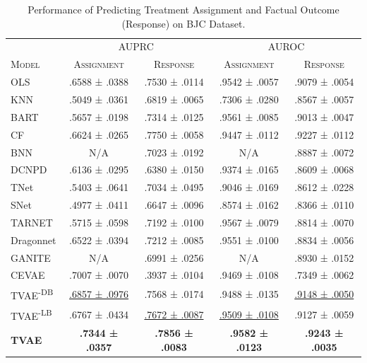 \begin{table}[t]
  \caption{Performance of Predicting Treatment Assignment and Factual Outcome (Response) on BJC Dataset.}
  \label{Table2}
  \centering
\fontsize{7.5pt}{9pt}\selectfont
  
  \begin{tabular}{lcccc}
    \toprule
    & \multicolumn{2}{c}{AUPRC}&\multicolumn{2}{c}{AUROC}\\
    \textsc{Model} & \textsc{Assignment} & \textsc{Response} &  \textsc{Assignment} & \textsc{Response}\\
    \midrule
    OLS & .6588 ± .0388  & .7530 ± .0114    & .9542 ± .0057  & .9079 ± .0054  \\
    KNN  & .5049 ± .0361  & .6819 ± .0065    & .7306 ± .0280  & .8567 ± .0057 \\
    BART & .5657 ± .0198  & .7314 ± .0125    & .9561 ± .0085  & .9013 ± .0047  \\
    CF  & .6624 ± .0265  & .7750 ± .0058    & .9447 ± .0112  & .9227 ± .0112  \\
    BNN  & N/A  & .7023 ± .0192    &  N/A & .8887 ± .0072 \\
    DCNPD   & .6136 ± .0295  & .6380 ± .0150    & .9374 ± .0165  & .8609 ± .0068  \\
    TNet    & .5403 ± .0641  & .7034 ± .0495    & .9046 ± .0169  & .8612 ± .0228  \\
    SNet    & .4977 ± .0411  & .6647 ± .0096    & .8574 ± .0162  & .8366 ± .0110  \\
    TARNET    & .5715 ± .0598  & .7192 ± .0100    & .9567 ± .0079 & .8814 ± .0070  \\
    Dragonnet    & .6522 ± .0394  & .7212 ± .0085    & .9551 ± .0100  & .8834 ± .0056  \\
    GANITE   & N/A  & .6991 ± .0256    & N/A  & .8930 ± .0152  \\
    CEVAE   & .7007 ± .0070  & .3937 ± .0104    & .9469 ± .0108  & .7349 ± .0062  \\
    \midrule
    TVAE\textsuperscript{-DB} &  \underline{.6857 ± .0976} & .7568 ± .0174 &	.9488 ± .0135 &	\underline{.9148 ± .0050}
     \\
    TVAE\textsuperscript{-LB} &  .6767 ± .0434 & \underline{.7672 ± .0087} &	\underline{.9509 ± .0108} &	.9127 ± .0059
    \\
    \textbf{TVAE}    & \textbf{.7344 ± .0357}  & \textbf{.7856 ± .0083}    & \textbf{.9582 ± .0123}  & \textbf{.9243 ± .0035}  \\
    \bottomrule
  \end{tabular}
\end{table}
